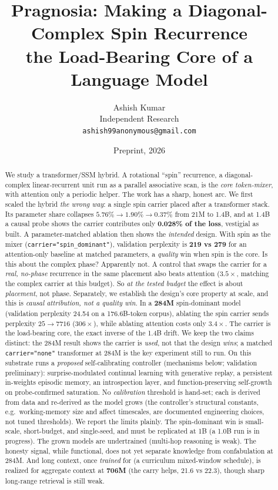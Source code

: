 \documentclass[11pt]{article}
\title{\bfseries Pragnosia: Making a Diagonal-Complex Spin Recurrence\\ the Load-Bearing Core of a Language Model}
\author{Ashish Kumar\\ \small Independent Research\\ \small \texttt{ashish99anonymous@gmail.com}}
\date{Preprint, 2026}
\newcommand{\code}[1]{\texttt{#1}}
\begin{document}
\maketitle

\begin{abstract}
\noindent We study a transformer/SSM hybrid. A rotational ``spin'' recurrence, a diagonal-complex linear-recurrent unit run as a parallel associative scan, is the \emph{core token-mixer}, with attention only a periodic helper. The work has a sharp, honest arc. We first scaled the hybrid \emph{the wrong way}: a single spin carrier placed after a transformer stack. Its parameter share collapses $5.76\% \to 1.90\% \to 0.37\%$ from 21M to 1.4B, and at 1.4B a causal probe shows the carrier contributes only \textbf{0.028\% of the loss}, vestigial as built. A parameter-matched ablation then shows the \emph{intended} design. With spin as the mixer (\code{carrier="spin\_dominant"}), validation perplexity is \textbf{219 vs 279} for an attention-only baseline at matched parameters, a \emph{quality} win when spin is the core. Is this about the complex phase? Apparently not. A control that swaps the carrier for a \emph{real, no-phase} recurrence in the same placement also beats attention ($3.5\times$, matching the complex carrier at this budget). So \emph{at the tested budget} the effect is about \emph{placement}, not phase. Separately, we establish the design's core property at scale, and this is \emph{causal attribution, not a quality win}. In a \textbf{284M} spin-dominant model (validation perplexity 24.54 on a 176.6B-token corpus), ablating the spin carrier sends perplexity $25 \to 7716$ ($306\times$), while ablating attention costs only $3.4\times$. The carrier is the load-bearing core, the exact inverse of the 1.4B drift. We keep the two claims distinct: the 284M result shows the carrier is \emph{used}, not that the design \emph{wins}; a matched \code{carrier="none"} transformer at 284M is the key experiment still to run. On this substrate runs a \emph{proposed} self-calibrating controller (mechanisms below; validation preliminary): surprise-modulated continual learning with generative replay, a persistent in-weights episodic memory, an introspection layer, and function-preserving self-growth on probe-confirmed saturation. No \emph{calibration} threshold is hand-set; each is derived from data and re-derived as the model grows (the controller's structural constants, e.g.\ working-memory size and affect timescales, are documented engineering choices, not tuned thresholds). We report the limits plainly. The spin-dominant win is small-scale, short-budget, and single-seed, and must be replicated at 1B (a 1.0B run is in progress). The grown models are undertrained (multi-hop reasoning is weak). The honesty signal, while functional, does not yet separate knowledge from confabulation at 284M. And long context, once \emph{trained} for (a curriculum mixed-window schedule), is realized for aggregate context at \textbf{706M} (the carry helps, 21.6 vs 22.3), though sharp long-range retrieval is still weak.
\end{abstract}
\end{document}
